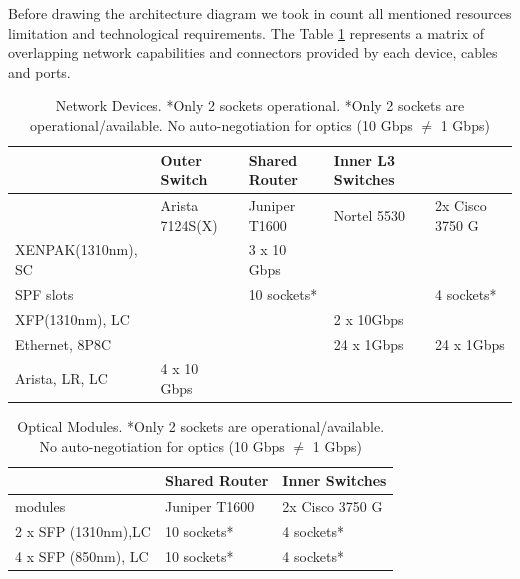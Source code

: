 \documentclass[10pt,a4paper]{article}
\begin{document}
Before drawing the architecture diagram we took in count all mentioned resources limitation and technological requirements. The Table \ref{tab:NetworkDevices} represents a matrix of overlapping network capabilities and connectors provided by each device, cables and ports.

\begin{table}[htbp]
\centering
\begin{tabular}{@{}lllll@{}}
\\\hline
                           & Outer Switch    & Shared Router & Inner L3 Switches &               \\\hline
                           & Arista 7124S(X) & Juniper T1600        & Nortel 5530         & 2x Cisco 3750 G \\\hline
XENPAK(1310nm), SC         &                 & 3 x 10 Gbps          &                     &               \\
SPF slots                       &                 & 10 sockets*          &                     & 4 sockets*    \\
XFP(1310nm), LC            &                 &                      & 2 x 10Gbps          &               \\
Ethernet, 8P8C &                 &                      & 24 x 1Gbps                 & 24 x 1Gbps          \\
Arista, LR, LC             & 4 x 10 Gbps     &                      &                     &               \\ \hline
\end{tabular}
\caption{Network Devices. *Only 2 sockets operational. *Only 2 sockets are operational/available. No auto-negotiation for optics (10 Gbps $\neq$ 1 Gbps)}
\label{tab:NetworkDevices}
\end{table}

\begin{table}[htbp]
\centering
\begin{tabular}{@{}lll@{}}
\\\hline
                    & Shared Router & Inner Switches \\\hline
modules             & Juniper T1600 & 2x Cisco 3750 G  \\\hline
2 x SFP (1310nm),LC   & 10 sockets*   & 4 sockets*     \\
4 x SFP (850nm), LC & 10 sockets*   & 4 sockets*     \\\hline
\end{tabular}
\caption{Optical Modules. *Only 2 sockets are operational/available. No auto-negotiation for optics (10 Gbps $\neq$ 1 Gbps)}
\label{tab:OpticalModules}
\end{table}
\end{document}
